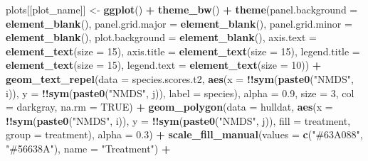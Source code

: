 \documentclass[
]{article}
\newenvironment{Shaded}{\begin{snugshade}}{\end{snugshade}}
\newcommand{\AttributeTok}[1]{\textcolor[rgb]{0.13,0.29,0.53}{#1}}
\newcommand{\ConstantTok}[1]{\textcolor[rgb]{0.56,0.35,0.01}{#1}}
\newcommand{\DecValTok}[1]{\textcolor[rgb]{0.00,0.00,0.81}{#1}}
\newcommand{\FloatTok}[1]{\textcolor[rgb]{0.00,0.00,0.81}{#1}}
\newcommand{\FunctionTok}[1]{\textcolor[rgb]{0.13,0.29,0.53}{\textbf{#1}}}
\newcommand{\NormalTok}[1]{#1}
\newcommand{\OtherTok}[1]{\textcolor[rgb]{0.56,0.35,0.01}{#1}}
\newcommand{\SpecialCharTok}[1]{\textcolor[rgb]{0.81,0.36,0.00}{\textbf{#1}}}
\newcommand{\StringTok}[1]{\textcolor[rgb]{0.31,0.60,0.02}{#1}}
\begin{document}
\begin{Shaded}
\begin{Highlighting}[]
\NormalTok{      plots[[plot\_name]] }\OtherTok{\textless{}{-}} \FunctionTok{ggplot}\NormalTok{() }\SpecialCharTok{+}
        \FunctionTok{theme\_bw}\NormalTok{() }\SpecialCharTok{+}
        \FunctionTok{theme}\NormalTok{(}\AttributeTok{panel.background =} \FunctionTok{element\_blank}\NormalTok{(),}
              \AttributeTok{panel.grid.major =} \FunctionTok{element\_blank}\NormalTok{(),}
              \AttributeTok{panel.grid.minor =} \FunctionTok{element\_blank}\NormalTok{(),}
              \AttributeTok{plot.background =} \FunctionTok{element\_blank}\NormalTok{(),}
              \AttributeTok{axis.text =} \FunctionTok{element\_text}\NormalTok{(}\AttributeTok{size =} \DecValTok{15}\NormalTok{),}
              \AttributeTok{axis.title =} \FunctionTok{element\_text}\NormalTok{(}\AttributeTok{size =} \DecValTok{15}\NormalTok{),}
              \AttributeTok{legend.title =} \FunctionTok{element\_text}\NormalTok{(}\AttributeTok{size =} \DecValTok{15}\NormalTok{),}
              \AttributeTok{legend.text =} \FunctionTok{element\_text}\NormalTok{(}\AttributeTok{size =} \DecValTok{10}\NormalTok{)) }\SpecialCharTok{+}
        \FunctionTok{geom\_text\_repel}\NormalTok{(}\AttributeTok{data =}\NormalTok{ species.scores.t2, }\FunctionTok{aes}\NormalTok{(}\AttributeTok{x =} \SpecialCharTok{!!}\FunctionTok{sym}\NormalTok{(}\FunctionTok{paste0}\NormalTok{(}\StringTok{"NMDS"}\NormalTok{, i)), }\AttributeTok{y =} \SpecialCharTok{!!}\FunctionTok{sym}\NormalTok{(}\FunctionTok{paste0}\NormalTok{(}\StringTok{"NMDS"}\NormalTok{, j)), }
                                                      \AttributeTok{label =}\NormalTok{ species), }\AttributeTok{alpha =} \FloatTok{0.9}\NormalTok{, }\AttributeTok{size =} \DecValTok{3}\NormalTok{, }\AttributeTok{col =} \StringTok{\textquotesingle{}darkgray\textquotesingle{}}\NormalTok{, }\AttributeTok{na.rm =} \ConstantTok{TRUE}\NormalTok{) }\SpecialCharTok{+}
        \FunctionTok{geom\_polygon}\NormalTok{(}\AttributeTok{data =}\NormalTok{ hulldat, }\FunctionTok{aes}\NormalTok{(}\AttributeTok{x =} \SpecialCharTok{!!}\FunctionTok{sym}\NormalTok{(}\FunctionTok{paste0}\NormalTok{(}\StringTok{"NMDS"}\NormalTok{, i)), }\AttributeTok{y =} \SpecialCharTok{!!}\FunctionTok{sym}\NormalTok{(}\FunctionTok{paste0}\NormalTok{(}\StringTok{"NMDS"}\NormalTok{, j)), }\AttributeTok{fill =}\NormalTok{ treatment, }\AttributeTok{group =}\NormalTok{ treatment), }\AttributeTok{alpha =} \FloatTok{0.3}\NormalTok{) }\SpecialCharTok{+}
        \FunctionTok{scale\_fill\_manual}\NormalTok{(}\AttributeTok{values =} \FunctionTok{c}\NormalTok{(}\StringTok{"\#63A088"}\NormalTok{, }\StringTok{"\#56638A"}\NormalTok{), }\AttributeTok{name =} \StringTok{"Treatment"}\NormalTok{) }\SpecialCharTok{+}

\end{Highlighting}
\end{Shaded}
\end{document}
